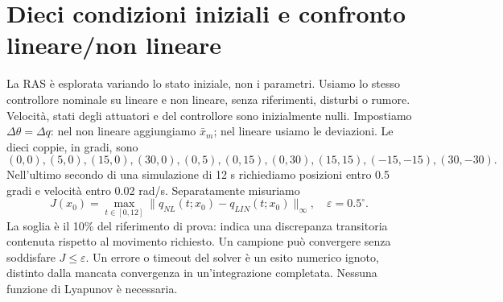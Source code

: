 \section{Dieci condizioni iniziali e confronto lineare/non lineare}
La RAS è esplorata variando lo stato iniziale, non i parametri.
Usiamo lo stesso controllore nominale su lineare e non lineare,
senza riferimenti, disturbi o rumore. Velocità, stati degli attuatori e
del controllore sono inizialmente nulli. Impostiamo $\Delta\theta=\Delta q$:
nel non lineare aggiungiamo $\bar x_m$; nel lineare usiamo le deviazioni.
Le dieci coppie, in gradi, sono
\[
(0,0),(5,0),(15,0),(30,0),(0,5),(0,15),(0,30),
(15,15),(-15,-15),(30,-30).
\]
Nell'ultimo secondo di una simulazione di 12 s richiediamo posizioni
entro 0.5 gradi e velocità entro 0.02 rad/s. Separatamente misuriamo
\[
J(x_0)=\max_{t\in[0,12]}\|q_{NL}(t;x_0)-q_{LIN}(t;x_0)\|_\infty,
\quad \varepsilon=0.5^\circ.
\]
La soglia è il 10\% del riferimento di prova: indica una discrepanza
transitoria contenuta rispetto al movimento richiesto. Un campione può
convergere senza soddisfare $J\le\varepsilon$. Un errore o timeout del
solver è un esito numerico ignoto, distinto dalla mancata convergenza
in un'integrazione completata. Nessuna funzione di Lyapunov è necessaria.
